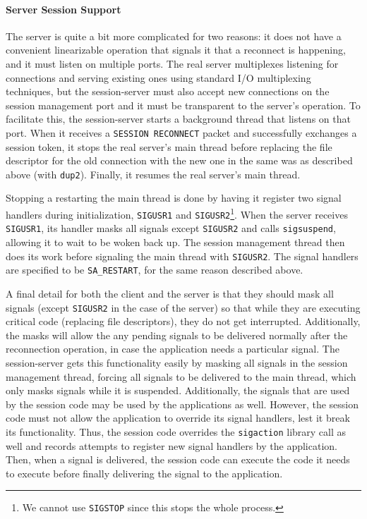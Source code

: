 \documentclass[twocolumn,11pt]{article}
\begin{document}
\paragraph{Server Session Support}
The server is quite a bit more complicated for two reasons: it does not have a
convenient linearizable operation that signals it that a reconnect is happening,
and it must listen on multiple ports.
The real server multiplexes listening for connections and serving existing ones
using standard I/O multiplexing techniques,
but the session-server must also accept new connections
on the session management port and it must be transparent to the server's
operation. To facilitate this, the session-server starts a
background thread that listens on that port. When it receives a \texttt{SESSION
RECONNECT} packet and successfully exchanges a session token, it stops the real
server's main thread before replacing the file descriptor for the old connection
with the new one in the same was as described above (with \texttt{dup2}).
Finally, it resumes the real server's main thread.

Stopping a restarting the main thread is done by having it register two signal
handlers during initialization, \texttt{SIGUSR1} and
\texttt{SIGUSR2}\footnote{We cannot use \texttt{SIGSTOP} since this stops the
whole process.}. When the
server receives \texttt{SIGUSR1}, its handler masks all signals except
\texttt{SIGUSR2} and calls \texttt{sigsuspend}, allowing it to wait to be woken
back up. The session management thread then does its work before signaling the
main thread with \texttt{SIGUSR2}. The signal handlers are specified to be
\texttt{SA\_RESTART}, for the same reason described above.

A final detail for both the client and the server is that they should mask all
signals (except \texttt{SIGUSR2} in the case of the server) so that while they
are executing critical code (replacing file descriptors), they do not get
interrupted. Additionally, the masks will allow the any pending signals to be delivered
normally after the reconnection operation, in case the application needs a
particular signal. The session-server gets this functionality easily by masking
all signals in the session management thread, forcing all signals to be
delivered to the main thread, which only masks signals while it is suspended.
Additionally, the signals that are used by the session code may be used
by the applications as well. However, the session code must not allow the
application to override its signal handlers, lest it break its functionality.
Thus, the session code overrides the \texttt{sigaction} library call as well and
records attempts to register new signal handlers by the application. Then, when
a signal is delivered, the session code can execute the code it needs to execute
before finally delivering the signal to the application.
\end{document}
